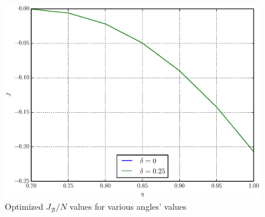 \documentclass[%
master,         %
subf,           %
href,           %
colorlinks=true %
]{disser}
\numberwithin{equation}{section}
\numberwithin{figure}{section}
\begin{document}
\begin{figure}[t]
\includegraphics[scale=0.7]{K_4ang.eps}
\caption{Optimized $J_{\mathcal{B}}/N$ values for various angles' values}
\label{fig:J_4ang}
\end{figure}
\end{document}
